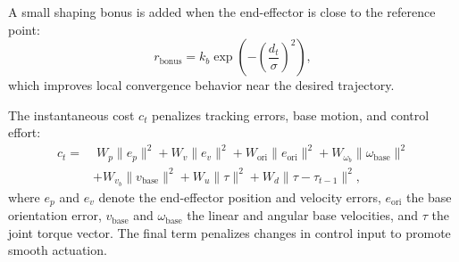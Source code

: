 \documentclass{ieeeaccess}
\begin{document}
A small shaping bonus is added when the end-effector is close to the reference point:
\begin{equation}
r_{\text{bonus}} = k_b \exp\!\left(-\left(\frac{d_t}{\sigma}\right)^2\right),
\end{equation}
which improves local convergence behavior near the desired trajectory.

The instantaneous cost $c_t$ penalizes tracking errors, base motion, and control effort:
\begin{align}
c_t =&\;
W_p \|e_p\|^2
+ W_v \|e_v\|^2
+ W_{\text{ori}} \|e_{\text{ori}}\|^2
+ W_{\omega_b} \|\omega_{\text{base}}\|^2 \nonumber \\
&+ W_{v_b} \|v_{\text{base}}\|^2
+ W_u \|\tau\|^2
+ W_d \|\tau - \tau_{t-1}\|^2 ,
\end{align}
where $e_p$ and $e_v$ denote the end-effector position and velocity errors, $e_{\text{ori}}$ the base orientation error, $v_{\text{base}}$ and $\omega_{\text{base}}$ the linear 
and angular base velocities, and $\tau$ the joint torque vector. The final term penalizes changes in control input to promote smooth actuation.
\end{document}
